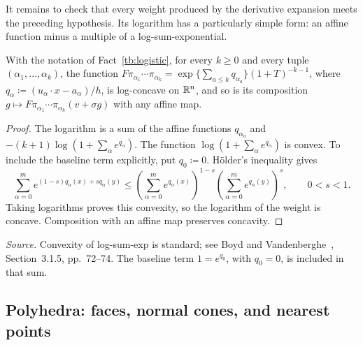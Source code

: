 It remains to check that every weight produced by the derivative
expansion meets the preceding hypothesis. Its logarithm has a particularly
simple form: an affine function minus a multiple of a log-sum-exponential.

\begin{fact}\label{tb:lc-weights}
With the notation of Fact~\ref{tb:logistic}, for every \(k\ge0\) and every
tuple \((\alpha_1,\ldots,\alpha_k)\), the function
\(F\pi_{\alpha_1}\cdots\pi_{\alpha_k}=\exp\{\sum_{a\le k}q_{\alpha_a}\}
(1+T)^{-k-1}\), where \(q_\alpha\coloneqq (u_\alpha\cdot x-a_\alpha)/h\), is
log-concave on \(\mathbb R^n\), and so is its composition
\(g\mapsto F\pi_{\alpha_1}\cdots\pi_{\alpha_k}(v+\sigma g)\) with any affine map.
\end{fact}

\begin{proof}
The logarithm is a sum of the affine functions \(q_{\alpha_a}\) and
\(-(k+1)\log(1+\sum_\alpha e^{q_\alpha})\). The function
\(\log(1+\sum_\alpha e^{q_\alpha})\) is convex. To include the baseline
term explicitly, put \(q_0\coloneqq0\). H\"older's inequality gives
\[
 \sum_{\alpha=0}^m e^{(1-s)q_\alpha(x)+s q_\alpha(y)}
 \le\left(\sum_{\alpha=0}^m e^{q_\alpha(x)}\right)^{1-s}
     \left(\sum_{\alpha=0}^m e^{q_\alpha(y)}\right)^s,
 \qquad 0<s<1.
\]
Taking logarithms proves this convexity, so the logarithm of the weight
is concave. Composition with an affine map preserves concavity.
\end{proof}

\emph{Source.} Convexity of log-sum-exp is standard; see
Boyd and Vandenberghe~, Section~3.1.5, pp.~72--74.
The baseline term \(1=e^{q_0}\), with \(q_0=0\), is included in that sum.

\subsection{Polyhedra: faces, normal cones, and nearest points}\label{tb:sec:poly}

